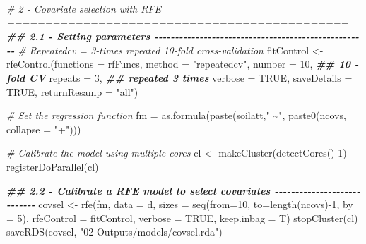 \documentclass[
  10pt,
  b5paper,
  oneside]{book}
\newenvironment{Shaded}{\begin{snugshade}}{\end{snugshade}}
\newcommand{\AttributeTok}[1]{\textcolor[rgb]{0.77,0.63,0.00}{#1}}
\newcommand{\CommentTok}[1]{\textcolor[rgb]{0.56,0.35,0.01}{\textit{#1}}}
\newcommand{\ConstantTok}[1]{\textcolor[rgb]{0.00,0.00,0.00}{#1}}
\newcommand{\DecValTok}[1]{\textcolor[rgb]{0.00,0.00,0.81}{#1}}
\newcommand{\DocumentationTok}[1]{\textcolor[rgb]{0.56,0.35,0.01}{\textbf{\textit{#1}}}}
\newcommand{\FunctionTok}[1]{\textcolor[rgb]{0.00,0.00,0.00}{#1}}
\newcommand{\NormalTok}[1]{#1}
\newcommand{\OtherTok}[1]{\textcolor[rgb]{0.56,0.35,0.01}{#1}}
\newcommand{\SpecialCharTok}[1]{\textcolor[rgb]{0.00,0.00,0.00}{#1}}
\newcommand{\StringTok}[1]{\textcolor[rgb]{0.31,0.60,0.02}{#1}}
\begin{document}
\begin{Shaded}
\begin{Highlighting}[]
\CommentTok{\# 2 {-} Covariate selection with RFE =============================================}
\DocumentationTok{\#\# 2.1 {-} Setting parameters {-}{-}{-}{-}{-}{-}{-}{-}{-}{-}{-}{-}{-}{-}{-}{-}{-}{-}{-}{-}{-}{-}{-}{-}{-}{-}{-}{-}{-}{-}{-}{-}{-}{-}{-}{-}{-}{-}{-}{-}{-}{-}{-}{-}{-}{-}{-}{-}{-}{-}{-}{-}}
\CommentTok{\# Repeatedcv = 3{-}times repeated 10{-}fold cross{-}validation}
\NormalTok{fitControl }\OtherTok{\textless{}{-}} \FunctionTok{rfeControl}\NormalTok{(}\AttributeTok{functions =}\NormalTok{ rfFuncs,}
                         \AttributeTok{method =} \StringTok{"repeatedcv"}\NormalTok{,}
                         \AttributeTok{number =} \DecValTok{10}\NormalTok{,         }\DocumentationTok{\#\# 10 {-}fold CV}
                         \AttributeTok{repeats =} \DecValTok{3}\NormalTok{,        }\DocumentationTok{\#\# repeated 3 times}
                         \AttributeTok{verbose =} \ConstantTok{TRUE}\NormalTok{,}
                         \AttributeTok{saveDetails =} \ConstantTok{TRUE}\NormalTok{, }
                         \AttributeTok{returnResamp =} \StringTok{"all"}\NormalTok{)}

\CommentTok{\# Set the regression function}
\NormalTok{fm }\OtherTok{=} \FunctionTok{as.formula}\NormalTok{(}\FunctionTok{paste}\NormalTok{(soilatt,}\StringTok{" \textasciitilde{}"}\NormalTok{, }\FunctionTok{paste0}\NormalTok{(ncovs,}
                                             \AttributeTok{collapse =} \StringTok{"+"}\NormalTok{)))}

\CommentTok{\# Calibrate the model using multiple cores}
\NormalTok{cl }\OtherTok{\textless{}{-}} \FunctionTok{makeCluster}\NormalTok{(}\FunctionTok{detectCores}\NormalTok{()}\SpecialCharTok{{-}}\DecValTok{1}\NormalTok{)}
\FunctionTok{registerDoParallel}\NormalTok{(cl)}


\DocumentationTok{\#\# 2.2 {-} Calibrate a RFE model to select covariates {-}{-}{-}{-}{-}{-}{-}{-}{-}{-}{-}{-}{-}{-}{-}{-}{-}{-}{-}{-}{-}{-}{-}{-}{-}{-}{-}{-}}
\NormalTok{covsel }\OtherTok{\textless{}{-}} \FunctionTok{rfe}\NormalTok{(fm,}
              \AttributeTok{data =}\NormalTok{ d,  }
              \AttributeTok{sizes =} \FunctionTok{seq}\NormalTok{(}\AttributeTok{from=}\DecValTok{10}\NormalTok{, }\AttributeTok{to=}\FunctionTok{length}\NormalTok{(ncovs)}\SpecialCharTok{{-}}\DecValTok{1}\NormalTok{, }\AttributeTok{by =} \DecValTok{5}\NormalTok{),}
              \AttributeTok{rfeControl =}\NormalTok{ fitControl,}
              \AttributeTok{verbose =} \ConstantTok{TRUE}\NormalTok{,}
              \AttributeTok{keep.inbag =}\NormalTok{ T)}
\FunctionTok{stopCluster}\NormalTok{(cl)}
\FunctionTok{saveRDS}\NormalTok{(covsel, }\StringTok{"02{-}Outputs/models/covsel.rda"}\NormalTok{)}


\end{Highlighting}
\end{Shaded}
\end{document}
